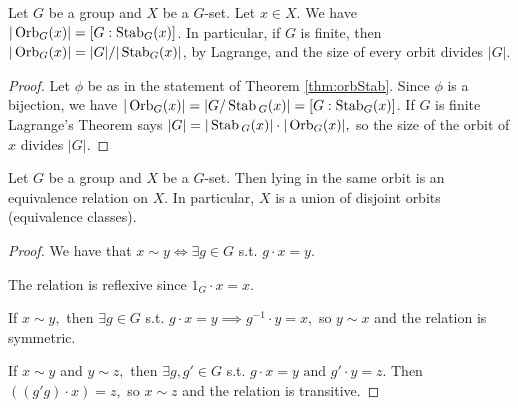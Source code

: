 \begin{corollary}
  Let $G$ be a group and $X$ be a $G$-set. Let $x\in X$. We have $|\operatorname*{Orb}_{G}(x)|=
  [G:\operatorname*{Stab}_G(x)]$. In particular, if $G$ is finite, then $|\operatorname*{Orb}_{G}(x)|=|G|/|\operatorname*{Stab}_G(x)|$,
  by Lagrange, and the size of every orbit divides $|G|$.
  \label{cor:orbStab}
\end{corollary}

\begin{proof}
    Let $\phi$ be as in the statement of Theorem \ref{thm:orbStab}. Since $\phi$ is a bijection, we have $|\operatorname*{Orb}_G(x)| = |G/\operatorname*{Stab}{}_{G}(x)| = [G:\operatorname*{Stab}_G(x)]$. If $G$ is finite Lagrange's Theorem says $|G| = |\operatorname*{Stab}{}_{G}(x)|\cdot |\operatorname*{Orb}_G(x)|,$ so the size of the orbit of $x$ divides $|G|.$
\end{proof}


\begin{theorem}
  Let $G$ be a group and $X$ be a $G$-set. Then lying in the same orbit is an equivalence
  relation on $X$. In particular, $X$ is a union of disjoint orbits (equivalence classes).
  \label{thm:eqRelOrb}
\end{theorem}
\begin{proof}
    We have that $x \sim y \iff \exists g\in G$ s.t. $g\cdot x = y.$ 

    The relation is reflexive since $1_G \cdot x = x.$ 
    
    If $x \sim y,$ then $\exists g\in G$ s.t. $g \cdot x = y \implies g^{-1} \cdot y = x,$ so $y \sim x$ and the relation is symmetric.

    If $x \sim y$ and $y \sim z,$ then $\exists g,g' \in G$ s.t. $g \cdot x = y \text{ and } g'\cdot y = z.$ Then $((g'g) \cdot x) = z,$ so $x \sim z$ and the relation is transitive.
\end{proof}



